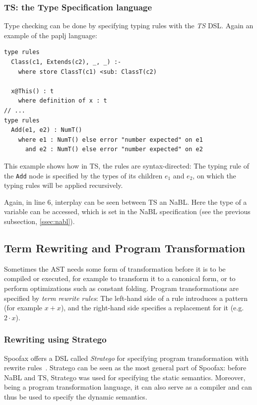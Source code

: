 \subsubsection{TS: the Type Specification language}
\label{ssec:orgheadline4}
Type checking can be done by specifying typing rules with the \emph{TS}
DSL. Again an example of the paplj language:
\lstset{language=type-spec,numbers=left}
\begin{lstlisting}
type rules
  Class(c1, Extends(c2), _, _) :-
    where store ClassT(c1) <sub: ClassT(c2)

  x@This() : t
    where definition of x : t
// ...
type rules
  Add(e1, e2) : NumT()
    where e1 : NumT() else error "number expected" on e1
      and e2 : NumT() else error "number expected" on e2
\end{lstlisting}
This example shows how in TS, the rules are syntax-directed: The
typing rule of the \texttt{Add} node is specified by the types of its
children \(e_1\) and \(e_2\), on which the typing rules will be applied
recursively.

Again, in line 6, interplay can be seen between TS an NaBL. Here the
type of a variable can be accessed, which is set in the NaBL
specification (see the previous subsection, \cref{ssec:nabl}).

\subsection{Term Rewriting and Program Transformation}
\label{ssec:term-rewrite}
Sometimes the AST needs some form of transformation before it is to be
compiled or executed, for example to transform it to a canonical form,
or to perform optimizations such as constant folding. Program
transformations are specified by \emph{term rewrite rules}: The left-hand
side of a rule introduces a pattern (for example \(x + x\)), and the
right-hand side specifies a replacement for it (e.g. \(2\cdot x\)).

\subsubsection{Rewriting using Stratego}
\label{ssec:orgheadline5}
Spoofax offers a DSL called \emph{Stratego} for specifying program
transformation with rewrite rules~\cite{Visser01}. Stratego can be
seen as the most general part of Spoofax: before NaBL and TS, Stratego
was used for specifying the static semantics. Moreover, being a
program transformation language, it can also serve as a compiler and
can thus be used to specify the dynamic semantics.

